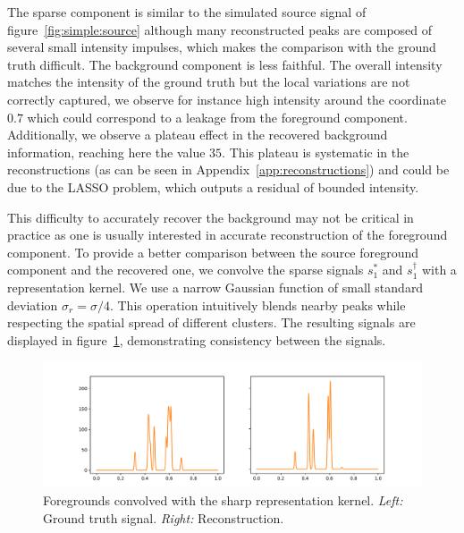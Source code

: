         The sparse component is similar to the simulated source signal of figure~\ref{fig:simple:source} although many reconstructed peaks are composed of several small intensity impulses, which makes the comparison with the ground truth difficult. The background component is less faithful. The overall intensity matches the intensity of the ground truth but the local variations are not correctly captured, we observe for instance high intensity around the coordinate $0.7$ which could correspond to a leakage from the foreground component. Additionally, we  observe a plateau effect in the recovered background information, reaching here the value $35$. This plateau is systematic in the reconstructions (as can be seen in Appendix~\ref{app:reconstructions}) and could be due to the LASSO problem, which outputs a residual of bounded intensity.

        This difficulty to accurately recover the background may not be critical in practice as one is usually interested in accurate reconstruction of the foreground component. To provide a better comparison between the source foreground component and the recovered one, we convolve the sparse signals $s_1^*$ and $s_1^\dagger$ with a representation kernel. We use a narrow Gaussian function of small standard deviation $\sigma_r = \sigma/4$. This operation intuitively blends nearby peaks while respecting the spatial spread of different clusters. The resulting signals are displayed in figure~\ref{fig:simple:recos-conv}, demonstrating consistency between the signals.
        
        \begin{figure}[t]
            \centering
            \includegraphics[width=\linewidth]{figures/simple_reco/recos_conv.pdf}        
            \caption{Foregrounds convolved with the sharp representation kernel. \textit{Left:} Ground truth signal. \textit{Right:} Reconstruction.}
            \label{fig:simple:recos-conv}
        \end{figure}

